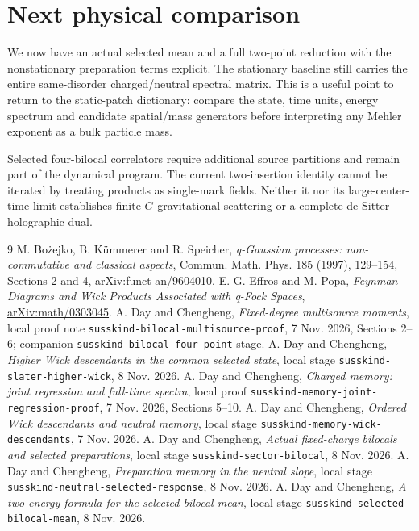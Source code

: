 \documentclass[11pt]{article}
\begin{document}
\newpage
\section{Next physical comparison}
We now have an actual selected mean and a full two-point
reduction with the nonstationary preparation terms explicit.
The stationary baseline still carries the entire same-disorder
charged/neutral spectral matrix. This is a useful point to return
to the static-patch dictionary: compare the state, time units,
energy spectrum and candidate spatial/mass generators before
interpreting any Mehler exponent as a bulk particle mass.

Selected four-bilocal correlators require additional source
partitions and remain part of the dynamical program. The current
two-insertion identity cannot be iterated by treating products as
single-mark fields. Neither it nor its large-center-time limit
establishes finite-$G$ gravitational scattering or a complete
de Sitter holographic dual.

\begin{thebibliography}{9}\small
{} M. Bo\.{z}ejko, B. K\"ummerer and R. Speicher,
\emph{q-Gaussian processes: non-commutative and classical aspects},
Commun. Math. Phys. 185 (1997), 129--154, Sections 2 and 4,
\href{https://arxiv.org/abs/funct-an/9604010}{arXiv:funct-an/9604010}.
 E. G. Effros and M. Popa,
\emph{Feynman Diagrams and Wick Products Associated with q-Fock Spaces},
\href{https://arxiv.org/abs/math/0303045}{arXiv:math/0303045}.
 A. Day and Chengheng,
\emph{Fixed-degree multisource moments}, local proof note
\texttt{susskind-bilocal-multisource-proof}, 7 Nov. 2026,
Sections 2--6; companion \texttt{susskind-bilocal-four-point} stage.
 A. Day and Chengheng,
\emph{Higher Wick descendants in the common selected state},
local stage \texttt{susskind-slater-higher-wick}, 8 Nov. 2026.
 A. Day and Chengheng,
\emph{Charged memory: joint regression and full-time spectra},
local proof \texttt{susskind-memory-joint-regression-proof},
7 Nov. 2026, Sections 5--10.
 A. Day and Chengheng,
\emph{Ordered Wick descendants and neutral memory},
local stage \texttt{susskind-memory-wick-descendants}, 7 Nov. 2026.
 A. Day and Chengheng,
\emph{Actual fixed-charge bilocals and selected preparations},
local stage \texttt{susskind-sector-bilocal}, 8 Nov. 2026.
 A. Day and Chengheng,
\emph{Preparation memory in the neutral slope}, local stage
\texttt{susskind-neutral-selected-response}, 8 Nov. 2026.
 A. Day and Chengheng,
\emph{A two-energy formula for the selected bilocal mean},
local stage \texttt{susskind-selected-bilocal-mean}, 8 Nov. 2026.
\end{thebibliography}
\end{document}
